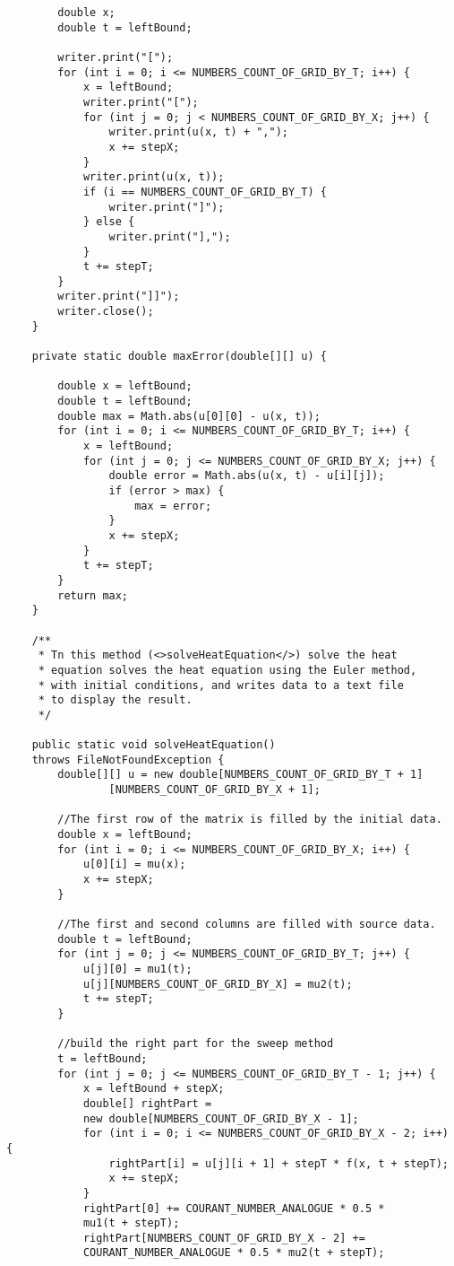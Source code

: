 \begin{verbatim}
        double x;
        double t = leftBound;

        writer.print("[");
        for (int i = 0; i <= NUMBERS_COUNT_OF_GRID_BY_T; i++) {
            x = leftBound;
            writer.print("[");
            for (int j = 0; j < NUMBERS_COUNT_OF_GRID_BY_X; j++) {
                writer.print(u(x, t) + ",");
                x += stepX;
            }
            writer.print(u(x, t));
            if (i == NUMBERS_COUNT_OF_GRID_BY_T) {
                writer.print("]");
            } else {
                writer.print("],");
            }
            t += stepT;
        }
        writer.print("]]");
        writer.close();
    }

    private static double maxError(double[][] u) {

        double x = leftBound;
        double t = leftBound;
        double max = Math.abs(u[0][0] - u(x, t));
        for (int i = 0; i <= NUMBERS_COUNT_OF_GRID_BY_T; i++) {
            x = leftBound;
            for (int j = 0; j <= NUMBERS_COUNT_OF_GRID_BY_X; j++) {
                double error = Math.abs(u(x, t) - u[i][j]);
                if (error > max) {
                    max = error;
                }
                x += stepX;
            }
            t += stepT;
        }
        return max;
    }

    /**
     * Tn this method (<>solveHeatEquation</>) solve the heat
     * equation solves the heat equation using the Euler method,
     * with initial conditions, and writes data to a text file 
     * to display the result.
     */

    public static void solveHeatEquation() 
    throws FileNotFoundException {
        double[][] u = new double[NUMBERS_COUNT_OF_GRID_BY_T + 1]
                [NUMBERS_COUNT_OF_GRID_BY_X + 1];

        //The first row of the matrix is filled by the initial data.
        double x = leftBound;
        for (int i = 0; i <= NUMBERS_COUNT_OF_GRID_BY_X; i++) {
            u[0][i] = mu(x);
            x += stepX;
        }

        //The first and second columns are filled with source data.
        double t = leftBound;
        for (int j = 0; j <= NUMBERS_COUNT_OF_GRID_BY_T; j++) {
            u[j][0] = mu1(t);
            u[j][NUMBERS_COUNT_OF_GRID_BY_X] = mu2(t);
            t += stepT;
        }

        //build the right part for the sweep method
        t = leftBound;
        for (int j = 0; j <= NUMBERS_COUNT_OF_GRID_BY_T - 1; j++) {
            x = leftBound + stepX;
            double[] rightPart = 
            new double[NUMBERS_COUNT_OF_GRID_BY_X - 1];
            for (int i = 0; i <= NUMBERS_COUNT_OF_GRID_BY_X - 2; i++) {
                rightPart[i] = u[j][i + 1] + stepT * f(x, t + stepT);
                x += stepX;
            }
            rightPart[0] += COURANT_NUMBER_ANALOGUE * 0.5 * 
            mu1(t + stepT);
            rightPart[NUMBERS_COUNT_OF_GRID_BY_X - 2] +=
            COURANT_NUMBER_ANALOGUE * 0.5 * mu2(t + stepT);


\end{verbatim}
